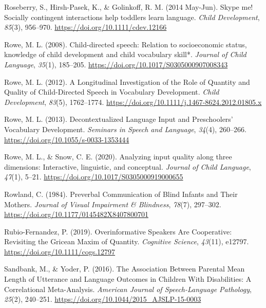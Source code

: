 \documentclass[
  man,floatsintext]{apa6}
\newlength{\cslhangindent}
\newlength{\cslentryspacingunit} %
\newenvironment{CSLReferences}[2] %
 {%
  \setlength{\parindent}{0pt}
  \ifodd #1
  \let\oldpar\par
  \def\par{\hangindent=\cslhangindent\oldpar}
  \fi
  \setlength{\parskip}{#2\cslentryspacingunit}
 }%
 {}
\begin{document}
\begin{CSLReferences}{1}{0}
\leavevmode{}%
Roseberry, S., Hirsh-Pasek, K., \& Golinkoff, R. M. (2014 May-Jun). Skype me! {Socially} contingent interactions help toddlers learn language. \emph{Child Development}, \emph{85}(3), 956--970. \url{https://doi.org/10.1111/cdev.12166}

\leavevmode{}%
Rowe, M. L. (2008). Child-directed speech: Relation to socioeconomic status, knowledge of child development and child vocabulary skill*. \emph{Journal of Child Language}, \emph{35}(1), 185--205. \url{https://doi.org/10.1017/S0305000907008343}

\leavevmode{}%
Rowe, M. L. (2012). A {Longitudinal Investigation} of the {Role} of {Quantity} and {Quality} of {Child-Directed Speech} in {Vocabulary Development}. \emph{Child Development}, \emph{83}(5), 1762--1774. \url{https://doi.org/10.1111/j.1467-8624.2012.01805.x}

\leavevmode{}%
Rowe, M. L. (2013). Decontextualized {Language Input} and {Preschoolers}' {Vocabulary Development}. \emph{Seminars in Speech and Language}, \emph{34}(4), 260--266. \url{https://doi.org/10.1055/s-0033-1353444}

\leavevmode{}%
Rowe, M. L., \& Snow, C. E. (2020). Analyzing input quality along three dimensions: Interactive, linguistic, and conceptual. \emph{Journal of Child Language}, \emph{47}(1), 5--21. \url{https://doi.org/10.1017/S0305000919000655}

\leavevmode{}%
Rowland, C. (1984). Preverbal {Communication} of {Blind Infants} and {Their Mothers}. \emph{Journal of Visual Impairment \& Blindness}, \emph{78}(7), 297--302. \url{https://doi.org/10.1177/0145482X8407800701}

\leavevmode{}%
Rubio-Fernandez, P. (2019). Overinformative {Speakers Are Cooperative}: {Revisiting} the {Gricean Maxim} of {Quantity}. \emph{Cognitive Science}, \emph{43}(11), e12797. \url{https://doi.org/10.1111/cogs.12797}

\leavevmode{}%
Sandbank, M., \& Yoder, P. (2016). The {Association Between Parental Mean Length} of {Utterance} and {Language Outcomes} in {Children With Disabilities}: {A Correlational Meta-Analysis}. \emph{American Journal of Speech-Language Pathology}, \emph{25}(2), 240--251. \url{https://doi.org/10.1044/2015_AJSLP-15-0003}


\end{CSLReferences}
\end{document}
